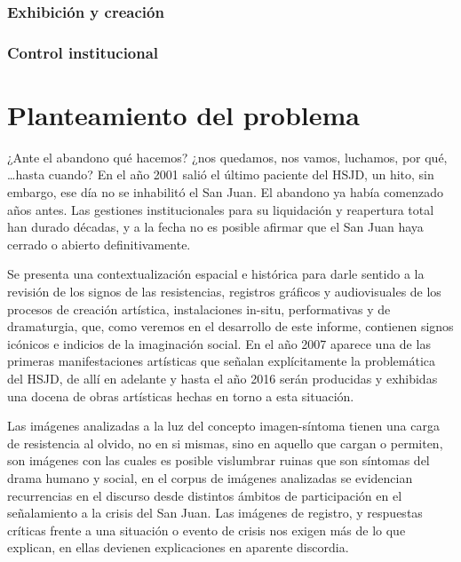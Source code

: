 \subsubsection*{Exhibición y creación}

\subsubsection*{Control institucional}


\section*{Planteamiento del problema }
¿Ante el abandono qué hacemos? ¿nos quedamos, nos vamos, luchamos, por qué, …hasta cuando? En el año 2001 salió el último paciente del HSJD, un hito, sin embargo, ese día no se inhabilitó el San Juan. El abandono ya había comenzado años antes. Las gestiones institucionales para su liquidación y reapertura total han durado décadas, y a la fecha no es posible afirmar que el San Juan haya cerrado o abierto definitivamente.

Se presenta una contextualización espacial e histórica para darle sentido a la revisión de los signos de las resistencias, registros gráficos y audiovisuales de los procesos de creación artística, instalaciones in-situ, performativas y de dramaturgia, que, como veremos en el desarrollo de este informe, contienen signos icónicos e indicios de la imaginación social. En el año 2007 aparece una de las primeras manifestaciones artísticas que señalan explícitamente la problemática del HSJD, de allí en adelante y hasta el año 2016 serán producidas y exhibidas una docena de obras artísticas hechas en torno a esta situación.

Las imágenes analizadas a la luz del concepto imagen-síntoma tienen una carga de resistencia al olvido, no en si mismas, sino en aquello que cargan o permiten, son imágenes con las cuales es posible vislumbrar ruinas que son síntomas del drama humano y social, en el corpus de imágenes analizadas se evidencian recurrencias en el discurso desde distintos ámbitos de participación en el señalamiento a la crisis del San Juan. Las imágenes de registro, y respuestas críticas frente a una situación o evento de crisis nos exigen más de lo que explican, en ellas devienen explicaciones en aparente discordia.


